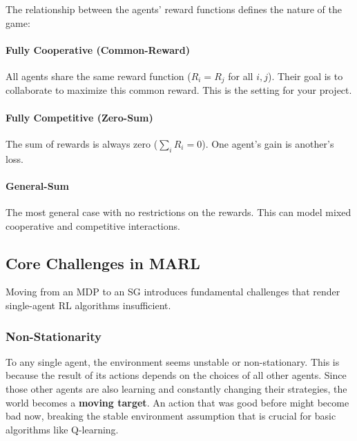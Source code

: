 The relationship between the agents' reward functions defines the nature of the game:

\paragraph{Fully Cooperative (Common-Reward)} All agents share the same reward function ($R_i = R_j$ for all $i,j$). Their goal is to collaborate to maximize this common reward. This is the setting for your project.

\paragraph{Fully Competitive (Zero-Sum)} The sum of rewards is always zero ($\sum_{i} R_i = 0$). One agent's gain is another's loss.

\paragraph{General-Sum} The most general case with no restrictions on the rewards. This can model mixed cooperative and competitive interactions.

\subsection{Core Challenges in MARL}
Moving from an MDP to an SG introduces fundamental challenges that render single-agent RL algorithms insufficient.

\subsubsection{Non-Stationarity}
To any single agent, the environment seems unstable or non-stationary. This is because the result of its actions depends on the choices of all other agents. Since those other agents are also learning and constantly changing their strategies, the world becomes a \textbf{moving target}. An action that was good before might become bad now, breaking the stable environment assumption that is crucial for basic algorithms like Q-learning.
